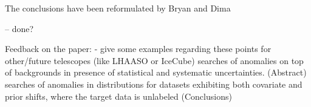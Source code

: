 The conclusions have been reformulated by Bryan and Dima

-- done?


Feedback on the paper: 
- give some examples regarding these points for other/future telescopes (like LHAASO or IceCube)
searches of anomalies on top of backgrounds in presence of statistical and systematic uncertainties. (Abstract)
searches of anomalies in distributions for datasets exhibiting both covariate and prior shifts, where the target data is unlabeled (Conclusions)
